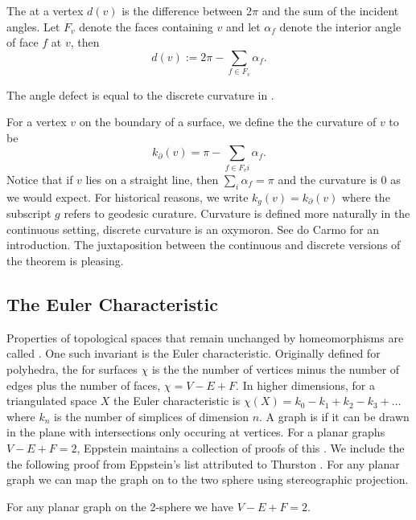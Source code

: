 The  at a vertex $d(v)$ is the difference between $2\pi$ and
the sum of the incident angles.  Let $F_v$ denote the faces containing $v$  
and let $\alpha_f$  denote the interior  angle of face $f$ at $v$, then
$$d(v):=2\pi -\sum_{f\in F_v}\alpha_f.$$

The angle defect is equal to the discrete curvature in .


For a vertex $v$ on the boundary of a surface, we define the the curvature
of $v$  to be 
$$k_{\partial}(v)= \pi-\sum_{f\in F_vi}\alpha_f.$$
Notice that if $v$ lies on a straight line, then $\sum_{i}\alpha_f=\pi$
and the curvature is $0$ as we would expect.
For historical reasons,  we write $k_g(v)=k_{\partial}(v)$
where the subscript $g$ refers to geodesic curature.
Curvature is defined more naturally in the continuous setting,
discrete curvature is an oxymoron.  See do Carmo \cite{doc76} for an introduction.
The juxtaposition between the continuous and discrete versions of the theorem
is pleasing.





\subsection{The Euler Characteristic}

Properties of topological spaces that remain unchanged by homeomorphisms are called
. One such invariant is the Euler characteristic.
Originally defined for polyhedra, the  for surfaces $\chi$ is the 
the number of vertices minus the number of edges plus  the number of faces, $\chi=V-E+F.$
In higher dimensions, for a triangulated space $X$ the Euler characteristic is 
$\chi(X)=k_0-k_1+k_2-k_3+\ldots$ where $k_n$ is the number of simplices of dimension $n.$
A  graph  is  if it can be drawn in the plane with intersections only occuring
at vertices.
For a planar graphs $V-E+F=2$, Eppstein maintains a collection of proofs of this \cite{eppstein-proofs}.
We include the the following proof from Eppstein's list attributed to Thurston
 \cite{thurston}. For any planar graph we can map the graph on to the two sphere
 using stereographic projection.
 
\begin{theorem}\label{thm:euler}
For any planar graph on the 2-sphere we have $V-E+F=2.$
\end{theorem}

